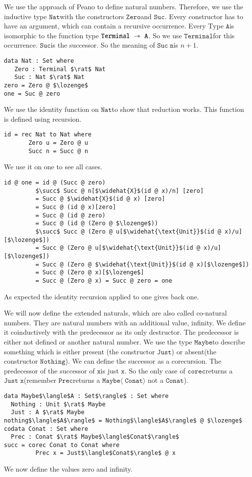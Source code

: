 \documentclass[a4paper,cleardoubleempty,BCOR1cm]{scrbook}
\begin{document}
We use the approach of Peano to define natural numbers.  Therefore, we use
the inductive type $\mathtt{Nat}$\;with the constructors $\mathtt{Zero}$\;and $\mathtt{Suc}$. Every
constructor has to have an argument, which can contain a recursive
occurrence. Every Type $\mathtt{A}$\;is isomorphic to the function type
$\mathtt{Terminal\;\rightarrowtriangle\;A}$. So we use $\mathtt{Terminal}$\;for this occurrence. $\mathtt{Suc}$\;is
the successor. So the meaning of $\mathtt{Suc\;n}$\;is \(n+1\).
\begin{lstlisting}
data Nat : Set where
   Zero : Terminal $\rat$ Nat
   Suc : Nat $\rat$ Nat
zero = Zero @ $\lozenge$
one = Suc @ zero
\end{lstlisting}
We use the identity function on $\mathtt{Nat}$\;to show that reduction works. This
function is defined using recursion.
\begin{lstlisting}
id = rec Nat to Nat where
       Zero u = Zero @ u
       Succ n = Succ @ n
\end{lstlisting}

We use it on one to see all cases.
\begin{lstlisting}
id @ one = id @ (Succ @ zero)
         $\succ$ Succ @ n[$\widehat{X}$(id @ x)/n] [zero]
         = Succ @ $\widehat{X}$(id @ x) [zero]
         = Succ @ (id @ x)[zero]
         = Succ @ (id @ zero)
         = Succ @ (id @ (Zero @ $\lozenge$))
         $\succ$ Succ @ (Zero @ u[$\widehat{\text{Unit}}$(id @ x)/u][$\lozenge$])
         = Succ @ (Zero @ u[$\widehat{\text{Unit}}$(id @ x)/u][$\lozenge$])
         = Succ @ (Zero @ $\widehat{\text{Unit}}$(id @ x)[$\lozenge$])
         = Succ @ (Zero @ x)[$\lozenge$]
         = Succ @ (Zero @ x) = Succ @ zero = one
\end{lstlisting}
As expected the identity recursion applied to one gives back one.

We will now define the extended naturals, which are also called co-natural numbers.
They are natural numbers with an additional value, infinity. We define it
coinductively with the predecessor as its only destructor. The predecessor is
either not defined or another natural number. We use the type $\mathtt{Maybe}$\;to
describe something which is either present (the constructor $\mathtt{Just}$) or
absent(the constructor $\mathtt{Nothing}$). We can define the successor as a
corecursion. The predecessor of the successor of $\mathtt{x}$\;is just $\mathtt{x}$. So the only
case of $\mathtt{corec}$\;returns a $\mathtt{Just\;x}$\;(remember $\mathtt{Prec}$\;returns a $\mathtt{Maybe\langle\;Conat\rangle}$
not a $\mathtt{Conat}$).
\begin{lstlisting}
data Maybe$\langle$A : Set$\rangle$ : Set where
  Nothing : Unit $\rat$ Maybe
  Just : A $\rat$ Maybe
nothing$\langle$A$\rangle$ = Nothing$\langle$A$\rangle$ @ $\lozenge$
codata Conat : Set where
  Prec : Conat $\rat$ Maybe$\langle$Conat$\rangle$
succ = corec Conat to Conat where
         Prec x = Just$\langle$Conat$\rangle$ @ x
\end{lstlisting}
We now define the values zero and infinity.
\end{document}
